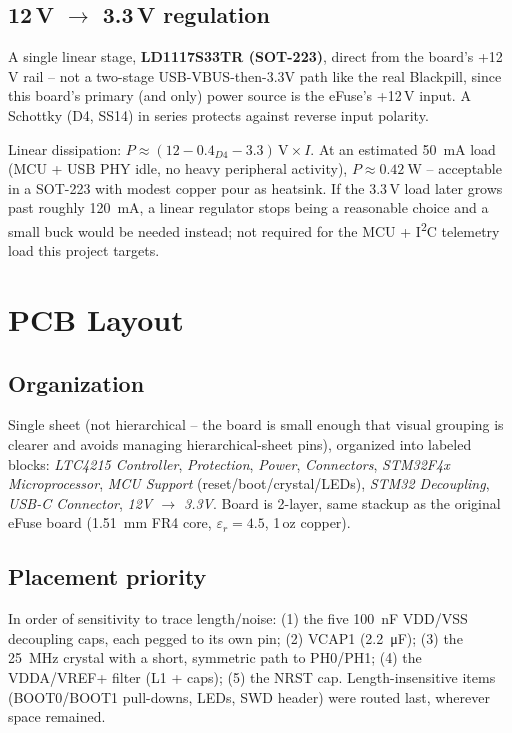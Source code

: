 \documentclass[11pt]{article}
\begin{document}
\subsection{12\,V $\to$ 3.3\,V regulation}

A single linear stage, \textbf{LD1117S33TR (SOT-223)}, direct from the board's +12\,V rail -- not a
two-stage USB-VBUS-then-3.3V path like the real Blackpill, since this board's primary (and only)
power source is the eFuse's +12\,V input. A Schottky (D4, SS14) in series protects against reverse
input polarity.

Linear dissipation: $P \approx (12 - 0.4_{D4} - 3.3)\,\si{\volt} \times I$. At an estimated
\SI{50}{\milli\ampere} load (MCU + USB PHY idle, no heavy peripheral activity), $P \approx
\SI{0.42}{\watt}$ -- acceptable in a SOT-223 with modest copper pour as heatsink. If the 3.3\,V load
later grows past roughly \SI{120}{\milli\ampere}, a linear regulator stops being a reasonable choice
and a small buck would be needed instead; not required for the MCU + I\textsuperscript{2}C telemetry
load this project targets.

\section{PCB Layout}

\subsection{Organization}

Single sheet (not hierarchical -- the board is small enough that visual grouping is clearer and
avoids managing hierarchical-sheet pins), organized into labeled blocks: \emph{LTC4215 Controller},
\emph{Protection}, \emph{Power}, \emph{Connectors}, \emph{STM32F4x Microprocessor}, \emph{MCU
Support} (reset/boot/crystal/LEDs), \emph{STM32 Decoupling}, \emph{USB-C Connector}, \emph{12V
$\to$ 3.3V}. Board is 2-layer, same stackup as the original eFuse board
(\SI{1.51}{\milli\meter} FR4 core, $\varepsilon_r = 4.5$, 1\,oz copper).

\subsection{Placement priority}

In order of sensitivity to trace length/noise: (1) the five \SI{100}{\nano\farad} VDD/VSS decoupling
caps, each pegged to its own pin; (2) VCAP1 (\SI{2.2}{\micro\farad}); (3) the \SI{25}{\mega\hertz}
crystal with a short, symmetric path to PH0/PH1; (4) the VDDA/VREF+ filter (L1 + caps); (5) the NRST
cap. Length-insensitive items (BOOT0/BOOT1 pull-downs, LEDs, SWD header) were routed last, wherever
space remained.
\end{document}
